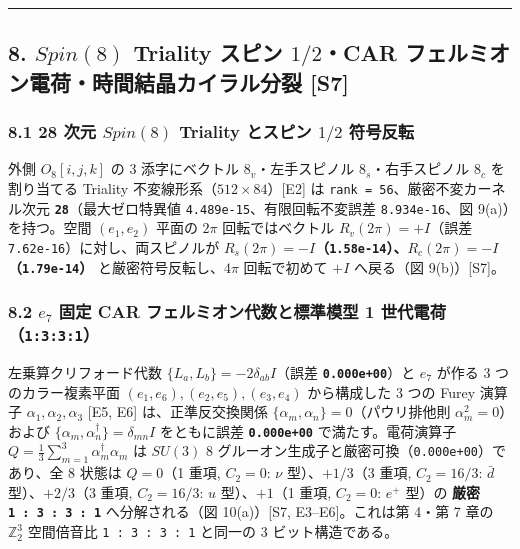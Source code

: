 \documentclass[
  a4paper,
]{ltjsarticle}
\begin{document}
\begin{center}\rule{0.5\linewidth}{0.5pt}\end{center}

\subsection{\texorpdfstring{8. \(Spin(8)\) Triality スピン \(1/2\)・CAR
フェルミオン電荷・時間結晶カイラル分裂
{[}S7{]}}{8. Spin(8) Triality スピン 1/2・CAR フェルミオン電荷・時間結晶カイラル分裂 {[}S7{]}}}\label{spin8-triality-ux30b9ux30d4ux30f3-12car-ux30d5ux30a7ux30ebux30dfux30aaux30f3ux96fbux8377ux6642ux9593ux7d50ux6676ux30abux30a4ux30e9ux30ebux5206ux88c2-s7}

\subsubsection{\texorpdfstring{8.1 28 次元 \(Spin(8)\) Triality とスピン
\(1/2\)
符号反転}{8.1 28 次元 Spin(8) Triality とスピン 1/2 符号反転}}\label{ux6b21ux5143-spin8-triality-ux3068ux30b9ux30d4ux30f3-12-ux7b26ux53f7ux53cdux8ee2}

外側 \(O_8[i, j, k]\) の 3 添字にベクトル \(8_v\)・左手スピノル
\(8_s\)・右手スピノル \(8_c\) を割り当てる Triality
不変線形系（\(512 \times 84\)）{[}E2{]} は
\texttt{rank\ =\ 56}、厳密不変カーネル次元
\textbf{\texttt{28}}（最大ゼロ特異値
\texttt{4.489e-15}、有限回転不変誤差 \texttt{8.934e-16}、図
9(a)）を持つ。空間 \((e_1, e_2)\) 平面の \(2\pi\) 回転ではベクトル
\(R_v(2\pi) = +I\)（誤差 \texttt{7.62e-16}）に対し、両スピノルが
\textbf{\(R_s(2\pi) = -I\)（\texttt{1.58e-14}）、\(R_c(2\pi) = -I\)（\texttt{1.79e-14}）}
と厳密符号反転し、\(4\pi\) 回転で初めて \(+I\) へ戻る（図
9(b)）{[}S7{]}。

\subsubsection{\texorpdfstring{8.2 \(e_7\) 固定 CAR
フェルミオン代数と標準模型 1
世代電荷（\texttt{1:3:3:1}）}{8.2 e\_7 固定 CAR フェルミオン代数と標準模型 1 世代電荷（1:3:3:1）}}\label{e_7-ux56faux5b9a-car-ux30d5ux30a7ux30ebux30dfux30aaux30f3ux4ee3ux6570ux3068ux6a19ux6e96ux6a21ux578b-1-ux4e16ux4ee3ux96fbux83771331}

左乗算クリフォード代数 \(\{L_a, L_b\} = -2\delta_{ab}I\)（誤差
\textbf{\texttt{0.000e+00}}）と \(e_7\) が作る 3 つのカラー複素平面
\((e_1,e_6), (e_2,e_5), (e_3,e_4)\) から構成した 3 つの Furey 演算子
\(\alpha_1, \alpha_2, \alpha_3\) {[}E5, E6{]} は、正準反交換関係
\(\{\alpha_m, \alpha_n\} = 0\)（パウリ排他則 \(\alpha_m^2 = 0\)）および
\(\{\alpha_m, \alpha_n^\dagger\} = \delta_{mn}I\) をともに誤差
\textbf{\texttt{0.000e+00}} で満たす。電荷演算子
\(Q = \frac{1}{3}\sum_{m=1}^3 \alpha_m^\dagger\alpha_m\) は \(SU(3)\) 8
グルーオン生成子と厳密可換（\texttt{0.000e+00}）であり、全 8 状態は
\(Q = 0\)（1 重項, \(C_2=0\): \(\nu\) 型）、\(+1/3\)（3 重項,
\(C_2=16/3\): \(\bar{d}\) 型）、\(+2/3\)（3 重項, \(C_2=16/3\): \(u\)
型）、\(+1\)（1 重項, \(C_2=0\): \(e^+\) 型）の \textbf{厳密
\texttt{1\ :\ 3\ :\ 3\ :\ 1}} へ分解される（図 10(a)）{[}S7,
E3--E6{]}。これは第 4・第 7 章の \(\mathbb{Z}_2^3\) 空間倍音比
\texttt{1\ :\ 3\ :\ 3\ :\ 1} と同一の 3 ビット構造である。
\end{document}
